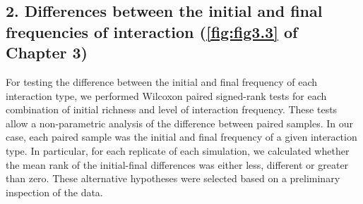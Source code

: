 \subsection*{2. Differences between the initial and final frequencies of interaction (\cref{fig:fig3.3} of Chapter 3)}\label{Interaction-frequencies}

For testing the difference between the initial and final frequency of each interaction type, we performed Wilcoxon paired signed-rank tests for each combination of initial richness and level of interaction frequency. These tests allow a non-parametric analysis of the difference between paired samples. In our case, each paired sample was the initial and final frequency of a given interaction type. In particular, for each replicate of each simulation, we calculated whether the mean rank of the initial-final differences was either less, different or greater than zero. These alternative hypotheses were selected based on a preliminary inspection of the data.

